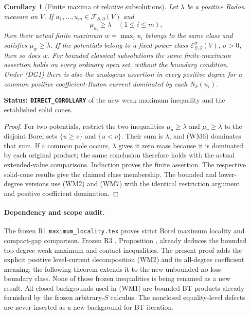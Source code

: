 \documentclass[11pt,a4paper]{article}
\numberwithin{equation}{section}
\newtheorem{corollary}[theorem]{Corollary}
\theoremstyle{definition}
\theoremstyle{remark}
\begin{document}
\begin{corollary}[Finite maxima of relative subsolutions]
\label{cor:r11-finite-subsolution-maxima}
Let $\lambda$ be a positive Radon measure on $V$. If
$u_1,\ldots,u_m\in\mathcal F_{S,\partial}(V)$ and
\[
                              \mu_{u_i}\geq\lambda
                                   \quad(1\leq i\leq m),
 \tag{WM10}
\]
then their actual finite maximum $w=\max_i u_i$ belongs
to the same class and satisfies $\mu_w\geq\lambda$.
If the potentials belong to a fixed power class
$\mathcal E^\sigma_{S,\partial}(V)$, $\sigma>0$, then
so does $w$. For bounded classical subsolutions the same
finite-maximum assertion holds on every ordinary open set,
without the boundary condition. Under (DG1) there is also
the analogous assertion in every positive degree for a common
positive coefficient-Radon current dominated by each $N_k(u_i)$.
\end{corollary}

\noindent\textbf{Status: \texttt{DIRECT\_COROLLARY}} of
the new weak maximum inequality and the established solid cones.

\begin{proof}
For two potentials, restrict the two inequalities
$\mu_u\geq\lambda$ and $\mu_v\geq\lambda$ to the
disjoint Borel sets $\{u\geq v\}$ and $\{u<v\}$.
Their sum is $\lambda$, and (WM6) dominates that sum.
If a common pole occurs, $\lambda$ gives it zero mass because
it is dominated by each original product; the same conclusion
therefore holds with the actual extended-value comparisons.
Induction proves the finite assertion. The respective solid-cone
results give the claimed class membership. The bounded and
lower-degree versions use (WM2) and (WM7) with the identical
restriction argument and positive coefficient domination.
\end{proof}

\paragraph{Dependency and scope audit.}
The frozen R1 \texttt{maximum\_locality.tex} proves strict Borel
maximum locality and compact-gap comparison. Frozen R3
, Proposition
, already deduces
the bounded top-degree weak maximum and contact inequalities.
The present proof adds the explicit positive level-current
decomposition (WM2) and its all-degree coefficient meaning;
the following theorem extends it to the new unbounded no-loss
boundary class. None of those frozen inequalities is being
renamed as a new result.
All closed backgrounds used in (WM1) are bounded BT products
already furnished by the frozen arbitrary-$S$ calculus. The
nonclosed equality-level defects are never inserted as a new
background for BT iteration.
\end{document}
